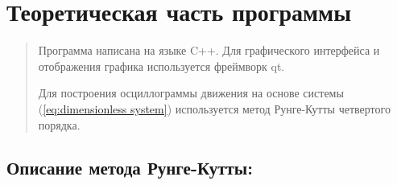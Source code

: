 \section{Теоретическая часть программы}

\begin{quotation}
Программа написана на языке C++. Для графического интерфейса и отображения графика используется фреймворк qt.

Для построения осциллограммы движения на основе системы (\ref{eq:dimensionless system}) используется метод Рунге-Кутты четвертого порядка.
\end{quotation}

\subsection*{Описание метода Рунге-Кутты:}
\label{RKmathod}

